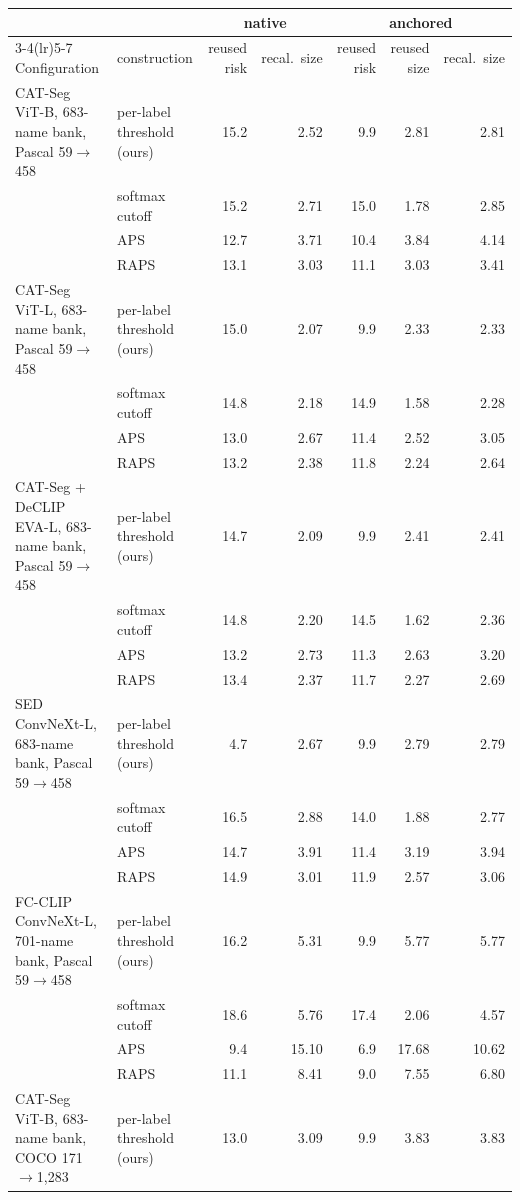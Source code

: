 \begin{tabular}{@{}llrrrrr@{}}
\toprule
& & \multicolumn{2}{c}{native} & \multicolumn{3}{c}{anchored} \\
\cmidrule(lr){3-4}\cmidrule(lr){5-7}
Configuration & construction & reused risk & recal.\ size & reused risk & reused size & recal.\ size \\
\midrule
CAT-Seg ViT-B, 683-name bank, Pascal 59$\to$458 & per-label threshold (ours) & 15.2 & 2.52 & 9.9 & 2.81 & 2.81 \\
 & softmax cutoff & 15.2 & 2.71 & 15.0 & 1.78 & 2.85 \\
 & APS & 12.7 & 3.71 & 10.4 & 3.84 & 4.14 \\
 & RAPS & 13.1 & 3.03 & 11.1 & 3.03 & 3.41 \\
\midrule
CAT-Seg ViT-L, 683-name bank, Pascal 59$\to$458 & per-label threshold (ours) & 15.0 & 2.07 & 9.9 & 2.33 & 2.33 \\
 & softmax cutoff & 14.8 & 2.18 & 14.9 & 1.58 & 2.28 \\
 & APS & 13.0 & 2.67 & 11.4 & 2.52 & 3.05 \\
 & RAPS & 13.2 & 2.38 & 11.8 & 2.24 & 2.64 \\
\midrule
CAT-Seg + DeCLIP EVA-L, 683-name bank, Pascal 59$\to$458 & per-label threshold (ours) & 14.7 & 2.09 & 9.9 & 2.41 & 2.41 \\
 & softmax cutoff & 14.8 & 2.20 & 14.5 & 1.62 & 2.36 \\
 & APS & 13.2 & 2.73 & 11.3 & 2.63 & 3.20 \\
 & RAPS & 13.4 & 2.37 & 11.7 & 2.27 & 2.69 \\
\midrule
SED ConvNeXt-L, 683-name bank, Pascal 59$\to$458 & per-label threshold (ours) & 4.7 & 2.67 & 9.9 & 2.79 & 2.79 \\
 & softmax cutoff & 16.5 & 2.88 & 14.0 & 1.88 & 2.77 \\
 & APS & 14.7 & 3.91 & 11.4 & 3.19 & 3.94 \\
 & RAPS & 14.9 & 3.01 & 11.9 & 2.57 & 3.06 \\
\midrule
FC-CLIP ConvNeXt-L, 701-name bank, Pascal 59$\to$458 & per-label threshold (ours) & 16.2 & 5.31 & 9.9 & 5.77 & 5.77 \\
 & softmax cutoff & 18.6 & 5.76 & 17.4 & 2.06 & 4.57 \\
 & APS & 9.4 & 15.10 & 6.9 & 17.68 & 10.62 \\
 & RAPS & 11.1 & 8.41 & 9.0 & 7.55 & 6.80 \\
\midrule
CAT-Seg ViT-B, 683-name bank, COCO 171$\to$1,283 & per-label threshold (ours) & 13.0 & 3.09 & 9.9 & 3.83 & 3.83 \\

\end{tabular}
